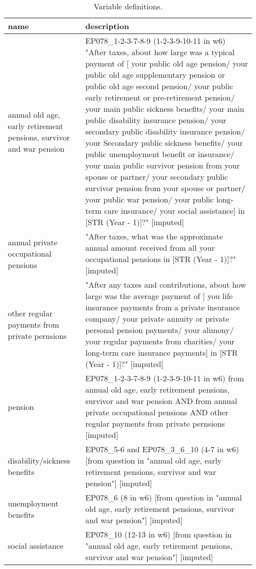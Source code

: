 \begin{table}[H]\centering\footnotesize
 \caption{\label{var_des} Variable definitions.}
\begin{tabular} {p{1.5in}p{4.5in}}   \hline
name & description   \\ \hline
  annual old age, early retirement pensions, survivor and war pension & EP078\_1-2-3-7-8-9 (1-2-3-9-10-11 in w6)  "After taxes, about how large was a typical payment of [ your public old age pension/ your public old age supplementary pension or public old age second pension/ your public early retirement or pre-retirement pension/ your main public sickness benefits/ your main public disability insurance pension/ your secondary public disability insurance pension/ your Secondary public sickness benefits/ your public unemployment benefit or insurance/ your main public survivor pension from your spouse or partner/ your secondary public survivor pension from your spouse or partner/ your public war pension/ your public long-term care insurance/ your social assistance] in [STR (Year - 1)]?" [imputed] \\
  annual private occupational pensions & "After taxes, what was the approximate annual amount received from all your occupational pensions in [STR (Year - 1)]?" [imputed] \\
  other regular payments from private pernsions & "After any taxes and contributions, about how large was the average payment of [ you life insurance payments from a private insurance company/ your private annuity or private personal pension payments/ your alimony/ your regular payments from charities/ your long-term care insurance payments] in [STR (Year - 1)]?" [imputed] \\
  pension & EP078\_1-2-3-7-8-9 (1-2-3-9-10-11 in w6) from annual old age, early retirement pensions, survivor and war pension AND from annual private occupational pensions AND other regular payments from private pernsions  [imputed] \\
  disability/sickness benefits & EP078\_5-6  and EP078\_3\_6\_10 (4-7 in w6) [from question in "annual old age, early retirement pensions, survivor and war pension"] [imputed] \\
  unemployment benefits & EP078\_6 (8 in w6) [from question in "annual old age, early retirement pensions, survivor and war pension"] [imputed] \\
  social assistance & EP078\_10 (12-13 in w6) [from question in "annual old age, early retirement pensions, survivor and war pension"] [imputed] \\
\hline\end{tabular}\end{table}